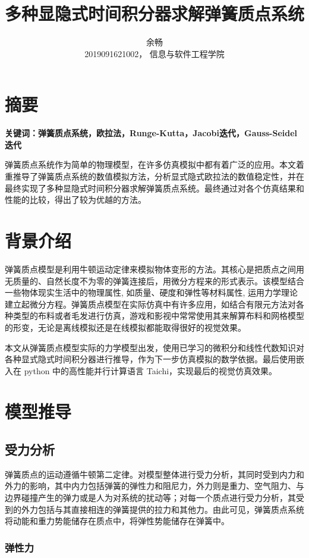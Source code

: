 \documentclass[UTF8]{ctexart}
\title{多种显隐式时间积分器求解弹簧质点系统}
\author{余畅 \\ 2019091621002， 信息与软件工程学院}
\begin{document}
\maketitle

\section{摘要}
\textbf{关键词：弹簧质点系统，欧拉法，Runge-Kutta，Jacobi迭代，Gauss-Seidel迭代} \par
弹簧质点系统作为简单的物理模型，在许多仿真模拟中都有着广泛的应用。本文着重推导了弹簧质点系统的数值模拟方法，分析显式隐式欧拉法的数值稳定性，并在最终实现了多种显隐式时间积分器求解弹簧质点系统。最终通过对各个仿真结果和性能的比较，得出了较为优越的方法。

\section{背景介绍}
弹簧质点模型是利用牛顿运动定律来模拟物体变形的方法。其核心是把质点之间用无质量的、自然长度不为零的弹簧连接后，用微分方程来的形式表示。该模型结合一些物体现实生活中的物理属性, 如质量、硬度和弹性等材料属性, 运用力学理论建立起微分方程。弹簧质点模型在实际仿真中有许多应用，如结合有限元方法对各种类型的布料或者毛发进行仿真，游戏和影视中常常使用其来解算布料和网格模型的形变，无论是离线模拟还是在线模拟都能取得很好的视觉效果。\par
本文从弹簧质点模型实际的力学模型出发，使用已学习的微积分和线性代数知识对各种显式隐式时间积分器进行推导，作为下一步仿真模拟的数学依据。最后使用嵌入在 python 中的高性能并行计算语言 Taichi，实现最后的视觉仿真效果。

\section{模型推导}

\subsection{受力分析}

弹簧质点的运动遵循牛顿第二定律。对模型整体进行受力分析，其同时受到内力和外力的影响，其中内力包括弹簧的弹性力和阻尼力，外力则是重力、空气阻力、与边界碰撞产生的弹力或是人为对系统的扰动等；对每一个质点进行受力分析，其受到的外力包括与其直接相连的弹簧提供的拉力和其他力。由此可见，弹簧质点系统将动能和重力势能储存在质点中，将弹性势能储存在弹簧中。\par

\subsubsection{弹性力}
\end{document}
